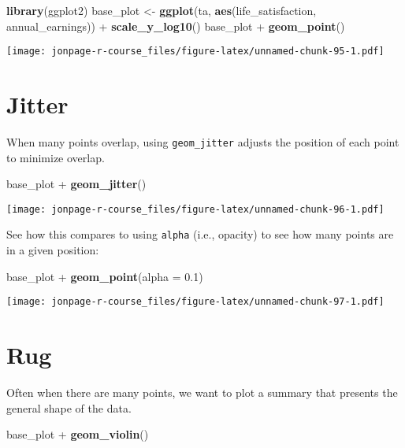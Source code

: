 \documentclass[]{book}
\newenvironment{Shaded}{\begin{snugshade}}{\end{snugshade}}
\newcommand{\KeywordTok}[1]{\textcolor[rgb]{0.13,0.29,0.53}{\textbf{{#1}}}}
\newcommand{\DataTypeTok}[1]{\textcolor[rgb]{0.13,0.29,0.53}{{#1}}}
\newcommand{\FloatTok}[1]{\textcolor[rgb]{0.00,0.00,0.81}{{#1}}}
\newcommand{\StringTok}[1]{\textcolor[rgb]{0.31,0.60,0.02}{{#1}}}
\newcommand{\NormalTok}[1]{{#1}}
\theoremstyle{definition}
\theoremstyle{definition}
\theoremstyle{remark}
\begin{document}
\begin{Shaded}
\begin{Highlighting}[]
\KeywordTok{library}\NormalTok{(ggplot2)}
\NormalTok{base_plot <-}\StringTok{ }\KeywordTok{ggplot}\NormalTok{(ta, }\KeywordTok{aes}\NormalTok{(life_satisfaction, annual_earnings)) +}\StringTok{ }\KeywordTok{scale_y_log10}\NormalTok{()}
\NormalTok{base_plot +}\StringTok{ }\KeywordTok{geom_point}\NormalTok{()}
\end{Highlighting}
\end{Shaded}

\texttt{[image: jonpage-r-course\_files/figure-latex/unnamed-chunk-95-1.pdf]}

\section{Jitter}\label{jitter}

When many points overlap, using \texttt{geom\_jitter} adjusts the
position of each point to minimize overlap.

\begin{Shaded}
\begin{Highlighting}[]
\NormalTok{base_plot +}\StringTok{ }\KeywordTok{geom_jitter}\NormalTok{()}
\end{Highlighting}
\end{Shaded}

\texttt{[image: jonpage-r-course\_files/figure-latex/unnamed-chunk-96-1.pdf]}

See how this compares to using \texttt{alpha} (i.e., opacity) to see how
many points are in a given position:

\begin{Shaded}
\begin{Highlighting}[]
\NormalTok{base_plot +}\StringTok{ }\KeywordTok{geom_point}\NormalTok{(}\DataTypeTok{alpha =} \FloatTok{0.1}\NormalTok{)}
\end{Highlighting}
\end{Shaded}

\texttt{[image: jonpage-r-course\_files/figure-latex/unnamed-chunk-97-1.pdf]}

\section{Rug}\label{rug}

Often when there are many points, we want to plot a summary that
presents the general shape of the data.

\begin{Shaded}
\begin{Highlighting}[]
\NormalTok{base_plot +}\StringTok{ }\KeywordTok{geom_violin}\NormalTok{()}
\end{Highlighting}
\end{Shaded}
\end{document}
